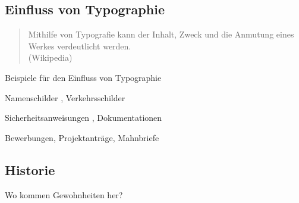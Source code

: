 \documentclass[ngerman,draft, usepdftitle=true]{beamer}
\begin{document}

\subsection{Einfluss von Typographie}
\frame{\subsectionpage}

\begin{frame}
\begin{quote}
  Mithilfe von Typografie kann der Inhalt, Zweck und die Anmutung eines
  Werkes verdeutlicht werden. \\(Wikipedia)
\end{quote}
\end{frame}

\begin{frame}{Beispiele für den Einfluss von Typographie}
  \begin{description}[Aufmerksamkeit]
  \item[Lesbarkeit] 
    Namenschilder , 
    Verkehrsschilder
  \item[Aufmerksamkeit] 
    Sicherheitsanweisungen , 
    Dokumentationen 
  \item[Aussage] 
    Bewerbungen, 
    Projektanträge, 
    Mahnbriefe
\end{description}
\end{frame}


\subsection{Historie}
\begin{frame}
  \subsectionpage
  
  \centering
  Wo kommen Gewohnheiten her?
\end{frame}
\end{document}

